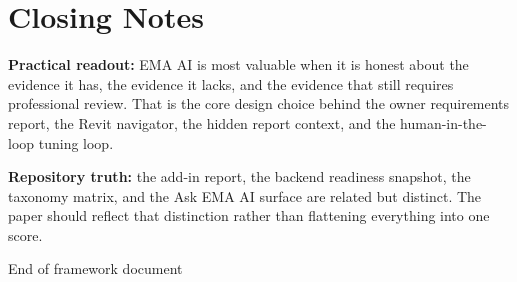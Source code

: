 \documentclass[10pt,letterpaper]{article}
\newcommand{\muted}[1]{\textcolor{emaMuted}{#1}}
\begin{document}
\begin{center}
\end{center}

\section*{Closing Notes}

\begin{tcolorbox}[colback=white]
\small
\textbf{Practical readout:} EMA AI is most valuable when it is honest about the evidence it has, the evidence it lacks, and the evidence that still requires professional review. That is the core design choice behind the owner requirements report, the Revit navigator, the hidden report context, and the human-in-the-loop tuning loop.

\vspace{4pt}
\textbf{Repository truth:} the add-in report, the backend readiness snapshot, the taxonomy matrix, and the Ask EMA AI surface are related but distinct. The paper should reflect that distinction rather than flattening everything into one score.
\end{tcolorbox}

\vfill
\begin{center}
\muted{End of framework document}
\end{center}
\end{document}
